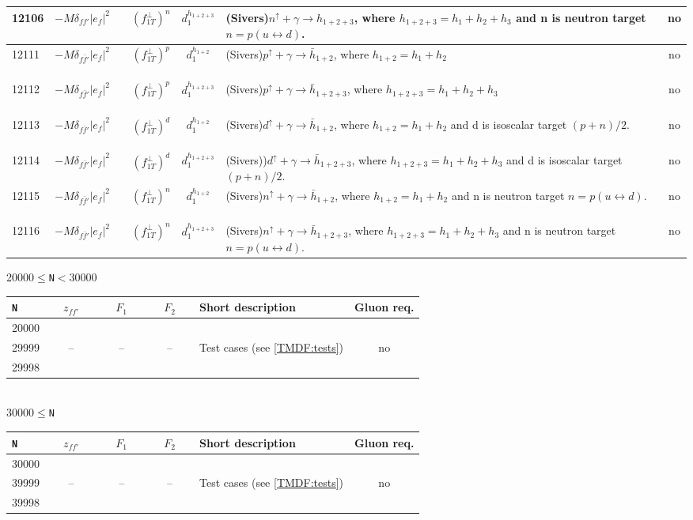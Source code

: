 \documentclass[prd,nofootinbib,eqsecnum,final]{revtex4}
\renewcommand{\(}{\left(}
\renewcommand{\)}{\right)}
\renewcommand{\[}{\left[}
\renewcommand{\]}{\right]}
\begin{document}
\begin{center}
\begin{longtable}{||l|p{6cm}|c|c||p{7cm}|c||}
\\\hline
12106 & $-M\delta_{ff'}|e_f|^2$~~&$(f_{1T}^\perp)^{n}$ & $d^{h_{1+2+3}}_1$ & (Sivers)$n^{\uparrow}+\gamma\to h_{1+2+3}$, where $h_{1+2+3}=h_1+h_2+h_3$ and n is neutron target $n=p(u\leftrightarrow d)$. & no
\\\hline
12111 & $-M\delta_{f\bar f'}|e_f|^2$~~&$(f_{1T}^\perp)^{p}$ & $d^{h_{1+2}}_1$ & (Sivers)$p^{\uparrow}+\gamma\to \bar h_{1+2}$, where $h_{1+2}=h_1+h_2$ & no
\\\hline
12112 & $-M\delta_{f\bar f'}|e_f|^2$~~&$(f_{1T}^\perp)^{p}$ & $d^{h_{1+2+3}}_1$ & (Sivers)$p^{\uparrow}+\gamma\to \bar h_{1+2+3}$, where $h_{1+2+3}=h_1+h_2+h_3$ & no
\\\hline
12113 & $-M\delta_{f\bar f'}|e_f|^2$~~&$(f_{1T}^\perp)^{d}$ & $d^{h_{1+2}}_1$ & (Sivers)$d^{\uparrow}+\gamma\to \bar h_{1+2}$, where $h_{1+2}=h_1+h_2$ and d is isoscalar target $(p+n)/2$. & no
\\\hline
12114 & $-M\delta_{f\bar f'}|e_f|^2$~~&$(f_{1T}^\perp)^{d}$ & $d^{h_{1+2+3}}_1$ & (Sivers))$d^{\uparrow}+\gamma\to \bar h_{1+2+3}$, where $h_{1+2+3}=h_1+h_2+h_3$ and d is isoscalar target $(p+n)/2$. & no
\\\hline
12115 & $-M\delta_{f\bar f'}|e_f|^2$~~&$(f_{1T}^\perp)^{n}$ & $d^{h_{1+2}}_1$ & (Sivers)$n^{\uparrow}+\gamma\to \bar h_{1+2}$, where $h_{1+2}=h_1+h_2$ and n is neutron target $n=p(u\leftrightarrow d)$. & no
\\\hline
12116 & $-M\delta_{f\bar f'}|e_f|^2$~~&$(f_{1T}^\perp)^{n}$ & $d^{h_{1+2+3}}_1$ & (Sivers)$n^{\uparrow}+\gamma\to \bar h_{1+2+3}$, where $h_{1+2+3}=h_1+h_2+h_3$ and n is neutron target $n=p(u\leftrightarrow d)$. & no
\\\hline\hline
\end{longtable}

20000$\leqslant$\texttt{N}$<$30000
\\
\begin{tabular}{||l|c|c|c||p{8cm}|c||}
\hline\hline
\texttt{N} & ~~$z_{ff'}$~~& ~~$F_1$~~ & ~~$F_2$~~&  Short description & Gluon req. 
\\\hline
20000 &  &  &  &  & 
\\
29999 & -- & -- & -- & Test cases (see \ref{TMDF:tests}) & no
\\
29998 &  &  &  &  & 
\\\hline\hline
\end{tabular}
\\
30000$\leqslant$\texttt{N}
\\
\begin{tabular}{||l|c|c|c||p{8cm}|c||}
\hline\hline
\texttt{N} & ~~$z_{ff'}$~~& ~~$F_1$~~ & ~~$F_2$~~&  Short description & Gluon req. 
\\\hline
30000 &  &  &  &  & 
\\
39999 & -- & -- & -- & Test cases (see \ref{TMDF:tests}) & no
\\
39998 &  &  &  &  & 
\\\hline\hline
\end{tabular}
\end{center}
\end{document}
